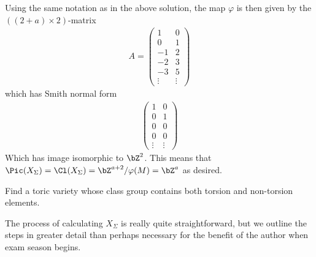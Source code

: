 \begin{homework}[e]
\begin{prf}
		Using the same notation as in the above solution, the map $\varphi$ is then given by the $((2+a) \times 2)$-matrix
		\begin{align*}
			A =
			\begin{pmatrix}	
                1 & 0 \\
				0 & 1 \\
				-1 & 2 \\
				-2 & 3 \\
				-3 & 5 \\
				\vdots & \vdots
			\end{pmatrix}
		\end{align*}
		which has Smith normal form
		\begin{align*}
			\begin{pmatrix}	
                1 & 0 \\
				0 & 1 \\
				0 & 0 \\
				0 & 0 \\
				\vdots & \vdots
			\end{pmatrix}
		\end{align*}
		Which has image isomorphic to $\bZ^2$. This means that $\Pic(X_\Sigma) = \Cl(X_\Sigma) = \bZ^{a+2}/\varphi(M) = \bZ^a$ as desired.
	\end{prf}

	\bigskip

	 Find a toric variety whose class group contains both torsion and non-torsion elements.
	\begin{prf}
		The process of calculating $X_\Sigma$ is really quite straightforward, but we outline the steps in greater detail than perhaps necessary for the benefit of the author when exam season begins.


\end{prf}
\end{homework}
